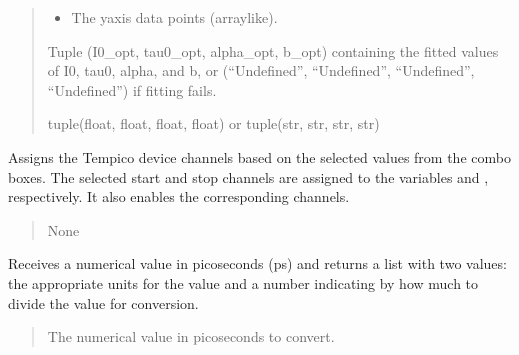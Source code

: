 \documentclass[letterpaper,10pt,english]{sphinxmanual}
\begin{document}
\begin{fulllineitems}
\begin{fulllineitems}
\begin{quote}
\begin{description}
\begin{itemize}
\item {} 
\sphinxAtStartPar
{} \textendash{} The y\sphinxhyphen{}axis data points (array\sphinxhyphen{}like).

\end{itemize}

\sphinxAtStartPar
Tuple (I0\_opt, tau0\_opt, alpha\_opt, b\_opt) containing the fitted values of I0, tau0, alpha, and b, or 
(“Undefined”, “Undefined”, “Undefined”, “Undefined”) if fitting fails.

\sphinxAtStartPar
tuple(float, float, float, float) or tuple(str, str, str, str)

\end{description}\end{quote}

\end{fulllineitems}


\begin{fulllineitems}
\label{\detokenize{FLIMGraphics:FLIMGraphics.FLIMGraphic.getTempicoChannel}}
\pysigstartsignatures
{}
\pysigstopsignatures
\sphinxAtStartPar
Assigns the Tempico device channels based on the selected values from the combo boxes.
The selected start and stop channels are assigned to the variables  
and , respectively. It also enables the corresponding channels.
\begin{quote}\begin{description}
\sphinxAtStartPar
None

\end{description}\end{quote}

\end{fulllineitems}


\begin{fulllineitems}
\label{\detokenize{FLIMGraphics:FLIMGraphics.FLIMGraphic.getUnits}}
\pysigstartsignatures
{}
\pysigstopsignatures
\sphinxAtStartPar
Receives a numerical value in picoseconds (ps) and returns a list with two values:
the appropriate units for the value and a number indicating by how much to divide 
the value for conversion.
\begin{quote}\begin{description}
\sphinxAtStartPar
{} \textendash{} The numerical value in picoseconds to convert.


\end{description}
\end{quote}
\end{fulllineitems}
\end{fulllineitems}
\end{document}
